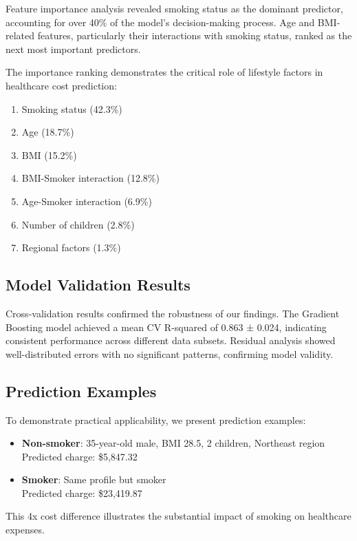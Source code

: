 \documentclass[times, twoside, watermark]{zHenriquesLab-StyleBioRxiv}
\begin{document}
Feature importance analysis revealed smoking status as the dominant predictor, accounting for over 40\% of the model's decision-making process. Age and BMI-related features, particularly their interactions with smoking status, ranked as the next most important predictors.

The importance ranking demonstrates the critical role of lifestyle factors in healthcare cost prediction:

\begin{enumerate}
\item Smoking status (42.3\%)
\item Age (18.7\%)
\item BMI (15.2\%)
\item BMI-Smoker interaction (12.8\%)
\item Age-Smoker interaction (6.9\%)
\item Number of children (2.8\%)
\item Regional factors (1.3\%)
\end{enumerate}

\subsection*{Model Validation Results}

Cross-validation results confirmed the robustness of our findings. The Gradient Boosting model achieved a mean CV R-squared of 0.863 ± 0.024, indicating consistent performance across different data subsets. Residual analysis showed well-distributed errors with no significant patterns, confirming model validity.

\subsection*{Prediction Examples}

To demonstrate practical applicability, we present prediction examples:

\begin{itemize}
\item \textbf{Non-smoker}: 35-year-old male, BMI 28.5, 2 children, Northeast region
  \\ Predicted charge: \$5,847.32
\item \textbf{Smoker}: Same profile but smoker
  \\ Predicted charge: \$23,419.87
\end{itemize}

This 4x cost difference illustrates the substantial impact of smoking on healthcare expenses.
\end{document}
